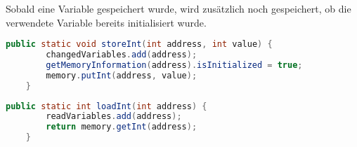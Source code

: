 Sobald eine Variable gespeichert wurde, wird zusätzlich noch gespeichert, ob die verwendete Variable bereits initialisiert wurde.
\begin{lstlisting}[language=JAVA]
	public static void storeInt(int address, int value) {
		changedVariables.add(address);
		getMemoryInformation(address).isInitialized = true;
		memory.putInt(address, value);
	}
\end{lstlisting}

\begin{lstlisting}[language=JAVA]
	public static int loadInt(int address) {
		readVariables.add(address);
		return memory.getInt(address);
	}
\end{lstlisting} 

%



